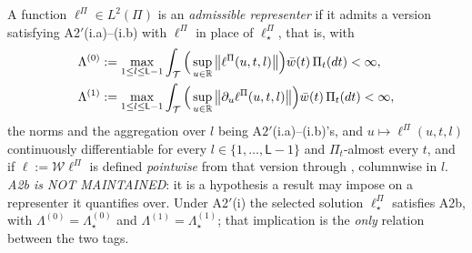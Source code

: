 \begin{assumption}\label{ass:admrep}
A function $\ell^\Pi\in L^{2}(\Pi)$ is an \emph{admissible representer} if it admits a version satisfying
A2$'$(i.a)--(i.b) with $\ell^\Pi$ in place of $\ell^\Pi_\star$, that is, with
\[
\begin{aligned}
\Lambda^{(0)}&:=\max_{1\le l\le\mathsf L-1}\int_{\mathcal T}\Big(\sup_{u\in\mathbb{R}}\big\|\ell^\Pi(u,t,l)\big\|\Big)\bar w(t)\,\Pi_t(dt)<\infty,\\
\Lambda^{(1)}&:=\max_{1\le l\le\mathsf L-1}\int_{\mathcal T}\Big(\sup_{u\in\mathbb{R}}\big\|\partial_u\ell^\Pi(u,t,l)\big\|\Big)\bar w(t)\,\Pi_t(dt)<\infty,
\end{aligned}
\]
the norms and the aggregation over $l$ being A$2'$(i.a)--(i.b)'s,
and $u\mapsto\ell^\Pi(u,t,l)$ continuously differentiable for every $l\in\{1,\dots,\mathsf L-1\}$ and
$\Pi_t$-almost every $t$, and if
$\ell:=\mathcal W\ell^\Pi$ is defined \emph{pointwise} from that version through ,
columnwise in $l$.
\emph{A2b is NOT MAINTAINED}: it is a hypothesis a result may impose on a representer it
quantifies over. Under A2$'$(i) the selected solution $\ell^\Pi_\star$ satisfies
A2b, with $\Lambda^{(0)}=\Lambda^{(0)}_\star$ and $\Lambda^{(1)}=\Lambda^{(1)}_\star$; that
implication is the \emph{only} relation between the two tags.
\end{assumption}

